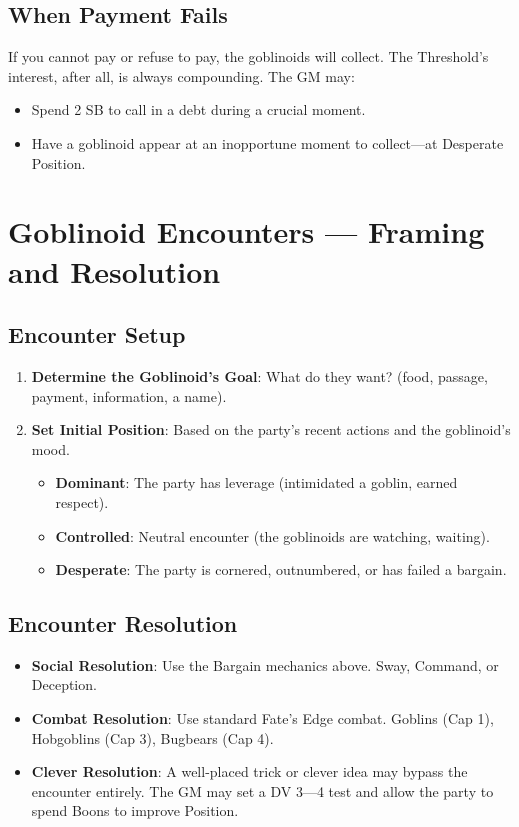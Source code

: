 \subsection{When Payment Fails}

If you cannot pay or refuse to pay, the goblinoids will collect. The Threshold's interest, after all, is always compounding. The GM may:

\begin{itemize}
    \item Spend 2 SB to call in a debt during a crucial moment.
    \item Have a goblinoid appear at an inopportune moment to collect---at Desperate Position.
\end{itemize}

\section{Goblinoid Encounters --- Framing and Resolution}

\subsection{Encounter Setup}

\begin{enumerate}
    \item \textbf{Determine the Goblinoid's Goal}: What do they want? (food, passage, payment, information, a name).
    \item \textbf{Set Initial Position}: Based on the party's recent actions and the goblinoid's mood.
    \begin{itemize}
        \item \textbf{Dominant}: The party has leverage (intimidated a goblin, earned respect).
        \item \textbf{Controlled}: Neutral encounter (the goblinoids are watching, waiting).
        \item \textbf{Desperate}: The party is cornered, outnumbered, or has failed a bargain.
    \end{itemize}
\end{enumerate}

\subsection{Encounter Resolution}

\begin{itemize}
    \item \textbf{Social Resolution}: Use the Bargain mechanics above. Sway, Command, or Deception.
    \item \textbf{Combat Resolution}: Use standard Fate's Edge combat. Goblins (Cap 1), Hobgoblins (Cap 3), Bugbears (Cap 4).
    \item \textbf{Clever Resolution}: A well-placed trick or clever idea may bypass the encounter entirely. The GM may set a DV 3---4 test and allow the party to spend Boons to improve Position.
\end{itemize}

